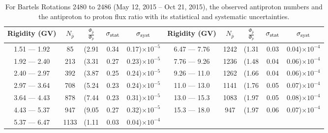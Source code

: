 \begin{table}[p] 
\renewcommand\baselinestretch{1.3}\selectfont
\setlength\tabcolsep{3pt}
\centering
\begin{tabular}{ccccc | ccccc}
\hline
\textbf{Rigidity}  (GV)  & $N_{\bar{p}}$ & $\frac{\Phi_{\bar{p}}}{\Phi_{p}}$ & $\sigma_{\rm{stat}}$ & $\sigma_{\rm{syst}}$ \hspace{1cm}   & \textbf{Rigidity}  (GV)  & $N_{\bar{p}}$ & $\frac{\Phi_{\bar{p}}}{\Phi_{p}}$ & $\sigma_{\rm{stat}}$ & $\sigma_{\rm{syst}}$ \hspace{1cm} \\ 
\hline
1.51 — 1.92   & 85                   &(2.91                          &  0.34              &      0.17)$\times 10^{-5}$  & 6.47 — 7.76                &  1242                    &(1.31                                &  0.03                   &      0.04)$\times 10^{-4}$\\
1.92 — 2.40   &  213                &(3.31                          &  0.27              &      0.23)$\times 10^{-5}$  & 7.76 — 9.26                &  1236                   &(1.48                                &  0.04                   &      0.06)$\times 10^{-4}$\\
2.40 — 2.97   &  392                &(3.87                          &  0.25              &      0.24)$\times 10^{-5}$  & 9.26 — 11.0                &  1262                    &(1.66                                &  0.04                   &      0.06)$\times 10^{-4}$\\    
2.97 — 3.64   &  708                &(5.24                          &  0.23              &      0.24)$\times 10^{-5}$  & 11.0 — 13.0                 &  1141                    &(1.76                                &  0.05                   &      0.07)$\times 10^{-4}$\\    
3.64 — 4.43   &  878                &(7.44                          &  0.23              &      0.31)$\times 10^{-5}$  & 13.0 — 15.3               &  1083                    &(1.97                                &  0.05                   &      0.08)$\times 10^{-4}$\\
4.43 — 5.37   &  947                &(9.05                          &  0.27              &      0.32)$\times 10^{-5}$  & 15.3 — 18.0               &  947                      &(1.97                                &  0.06                   &      0.07)$\times 10^{-4}$\\
5.37 — 6.47   &  1133              &(1.11                          &  0.03               &      0.04)$\times 10^{-4}$  & \\
\hline
\end{tabular}
\caption[Antiproton to proton flux ratio for Bartels Rotations 2480 to 2486]{For Bartels Rotations 2480 to 2486 (May 12, 2015 – Oct 21, 2015), the observed antiproton numbers and the antiproton to proton flux ratio with its statistical and systematic uncertainties.}
\label{TableOfDependent10}
\end{table}

